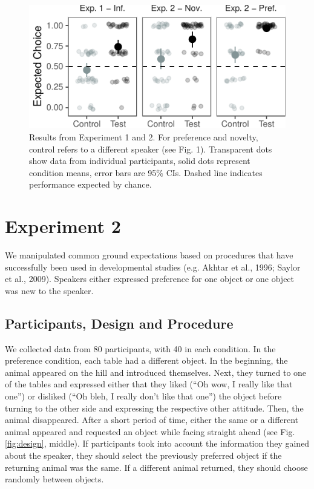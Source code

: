 \documentclass[10pt, letterpaper]{article}
\newenvironment{CodeChunk}{}{}
\begin{document}
\begin{CodeChunk}
\begin{figure}[H]

{\centering \includegraphics{figs/plotexp12-1} 

}

\caption[Results from Experiment 1 and 2]{Results from Experiment 1 and 2. For preference and novelty, control refers to a different speaker (see Fig. 1). Transparent dots show data from individual participants, solid dots represent condition means, error bars are 95\% CIs. Dashed line indicates performance expected by chance.}\label{fig:plotexp12}
\end{figure}
\end{CodeChunk}

\section{Experiment 2}\label{experiment-2}

We manipulated common ground expectations based on procedures that have
successfully been used in developmental studies (e.g. Akhtar et al.,
1996; Saylor et al., 2009). Speakers either expressed preference for one
object or one object was new to the speaker.

\subsection{Participants, Design and
Procedure}\label{participants-design-and-procedure-1}

We collected data from 80 participants, with 40 in each condition. In
the preference condition, each table had a different object. In the
beginning, the animal appeared on the hill and introduced themselves.
Next, they turned to one of the tables and expressed either that they
liked (``Oh wow, I really like that one'') or disliked (``Oh bleh, I
really don't like that one'') the object before turning to the other
side and expressing the respective other attitude. Then, the animal
disappeared. After a short period of time, either the same or a
different animal appeared and requested an object while facing straight
ahead (see Fig. \ref{fig:design}, middle). If participants took into
account the information they gained about the speaker, they should
select the previously preferred object if the returning animal was the
same. If a different animal returned, they should choose randomly
between objects.
\end{document}
